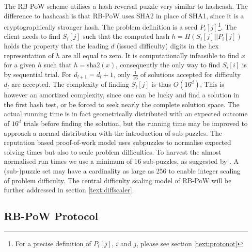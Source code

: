 The RB-PoW scheme utilises a hash-reversal puzzle very similar to hashcash. The difference to hashcash is that RB-PoW uses SHA2 in place of SHA1, since it is a cryptographically stronger hash\cite{nistsha1}.
The problem definition is a seed $P_i[j]$\footnote{For a precise definition of $P_i[j]$, $i$ and $j$, please see section \ref{text:protonot}}.
The client needs to find $S_i[j]$ such that the computed hash $ h = H(S_i[j]||P_i[j])$ holds the property that the leading $d$ (issued difficulty) digits in the hex representation of $h$ are all equal to zero. 
It is computationally infeasible to find $x$  for a given $h$ such that $ h = \mbox{sha2}(x)$\cite{sha2}, consequently the only way to find $S_i[i]$ is by sequential trial. For $d_{l+1} = d_l + 1 $, only $\frac{1}{16}$ of solutions accepted for difficulty $d_l$ are accepted.
The complexity of finding $S_i[j]$ is thus $O(16^d)$. This is however an amortized complexity, since one can be lucky and find a solution in the first hash test, or be forced to seek nearly the complete solution space.
The actual running time is in fact geometrically distributed with an expected outcome of $16^d$ trials before finding the solution, but the running time may be improved to approach a normal distribution with the introduction of sub-puzzles\cite{subpuzzles}. 
The reputation based proof-of-work model uses subpuzzles to normalise expected solving times but also to scale problem difficulties. To harvest the almost normalised run times we use a minimum of 16 sub-puzzles, as suggested by \citeauthor{subpuzzles}. A (sub-)puzzle set may have a cardinality as large as 256 to enable integer scaling of problem difficulty. The central difficulty scaling model of RB-PoW will be further addressed in section \ref{text:diffscaler}.

\subsection{RB-PoW Protocol}


